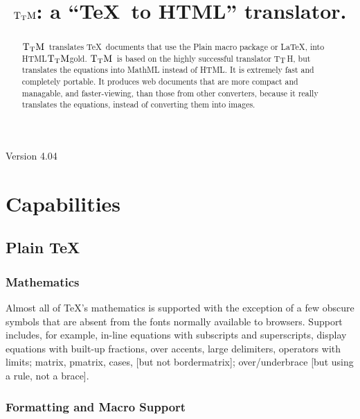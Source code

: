 \documentclass[12pt]{article}
\def\TtM{$\rm{}T_TH$}
\def\TtM{$\rm{}T_TM$}%
\def\TtMgold{\TtM{}gold}
\begin{document}
\title{\TtM: a ``\TeX\ to HTML'' translator.}
\centerline{Version 4.04}
\author{}\date{}
\maketitle

\begin{abstract}
\TtM\ translates \TeX\ documents that use the Plain macro package or
\LaTeX, into HTML\ifx\TtMgold\undefined\else.
\TtM\ is based on the highly successful translator 
T$_{\rm T}$H, but translates the equations into MathML instead of HTML\fi.
 It is extremely fast and completely portable. It
produces web documents that are more compact and managable, and
faster-viewing, than those from other converters, because it really
translates the equations, instead of converting them into images.
\end{abstract}

\tableofcontents

\section{Capabilities}

\subsection{Plain \TeX}


\subsubsection{Mathematics}

Almost all of \TeX's mathematics is supported with the exception of a
few obscure symbols that are absent from the fonts normally available
to browsers. Support includes, for example, in-line equations with
subscripts and superscripts, display equations with built-up
fractions, over accents, large delimiters, operators with limits;
matrix, pmatrix, cases, [but not bordermatrix]; over/underbrace [but
using a rule, not a brace].

\subsubsection{Formatting and Macro Support}
\end{document}
